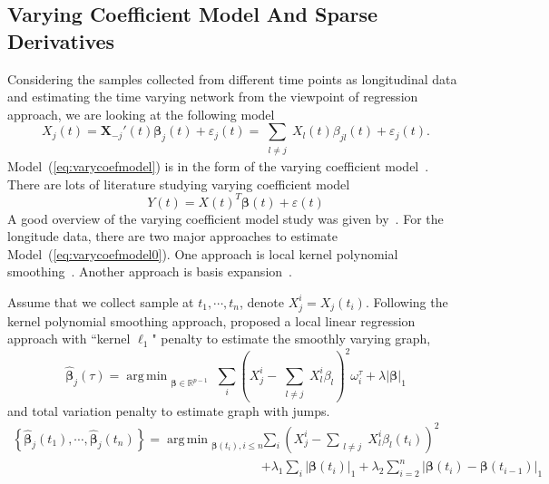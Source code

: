 \documentclass[11pt]{article}
\newcommand{\R}{\mathbb R}
\newcommand{\bX}{\mathbf X}
\newcommand{\bbeta}{{\boldsymbol{\beta}}}
\DeclareMathOperator*{\argmin}{arg\,min}
\begin{document}
\subsection{Varying Coefficient Model And Sparse Derivatives}
Considering the samples collected from different time points as longitudinal data and estimating the time varying network from the viewpoint of regression approach, we are looking at the following model
\begin{equation}
\label{eq:varycoefmodel}
X_j(t) = \bX_{-j}'(t) \bbeta_j(t) + \varepsilon_j(t) = \sum_{\substack{l\neq j}} X_l(t) \beta_{jl}(t) + \varepsilon_j(t).
\end{equation}
Model~(\ref{eq:varycoefmodel}) is in the form of the varying coefficient model~\citep{cleveland1992local, hastie1993varying}. There are lots of literature studying varying coefficient model
\begin{equation}
\label{eq:varycoefmodel0}
Y(t) = X(t)^T \bbeta(t) + \varepsilon(t) 
\end{equation}
A good overview of the varying coefficient model study was given by~\cite{fan2008statistical}. For the longitude data, there are two major approaches to estimate Model~(\ref{eq:varycoefmodel0}). One approach is local kernel polynomial smoothing~\citep{fan1999statistical, wu2000kernel}. Another approach is basis expansion~\citep{huang2002varying, huang2004polynomial}.

Assume that we collect sample at $t_1, \cdots, t_n$, denote $X_j^i = X_j(t_i)$. Following the kernel polynomial smoothing approach, \cite{kolar2009sparsistent, kolar2010estimating, kolar2011time, kolar2012estimating} proposed a local linear regression approach with ``kernel $\ell_1$" penalty  to estimate the smoothly varying graph,
\begin{equation}
	\label{eq:smoothgraph}
	\hat{\bbeta}_j(\tau) = \argmin_{\substack{\bbeta \in \R^{p-1}}} \sum_i(X_j^i - \sum_{\substack{l\neq j}} X_l^i \beta_l)^2 \omega_i^{\tau} + \lambda|\bbeta|_1
\end{equation}
and total variation penalty to estimate graph with jumps. 
\begin{equation}
	\label{eq::jumpgraph}
	\begin{aligned}
	\left\{ \hat{\bbeta}_j(t_1), \cdots, \hat{\bbeta}_j(t_n) \right\} = \argmin_{\substack{\bbeta(t_i), i \leq n}} &\sum_i(X_j^i - \sum_{\substack{l\neq j}} X_l^i \beta_l(t_i))^2  \\
	& + \lambda_1 \sum_{i}|\bbeta(t_i)|_1 + \lambda_2 \sum_{i = 2}^n|\bbeta(t_i) - \bbeta(t_{i-1})|_1
	\end{aligned}
\end{equation}
\end{document}
